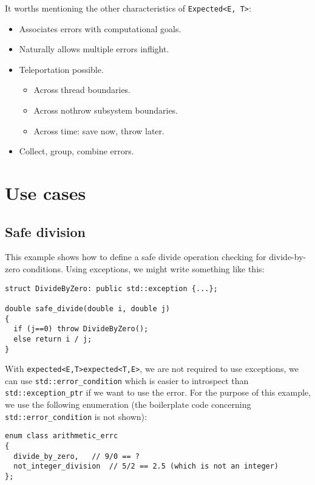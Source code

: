 \documentclass[a4paper,10pt]{article}
\newcommand{\cpp}[1]{\lstinline{#1}}
\newcommand{\suppress}[1]{\colorbox{suppress_color}{#1}}
\newcommand{\update}[1]{\colorbox{update_color}{#1}}
\begin{document}
\noindent
It worths mentioning the other characteristics of \cpp{Expected<E, T>}:

\begin{itemize}
 \item Associates errors with computational goals.
 \item Naturally allows multiple errors inflight.
 \item Teleportation possible.
 \begin{itemize}
  \item Across thread boundaries.
  \item Across nothrow subsystem boundaries.
  \item Across time: save now, throw later.
 \end{itemize}
 \item Collect, group, combine errors.
\end{itemize}

\section{Use cases}

\subsection{Safe division}
\label{divide-example}

This example shows how to define a safe divide operation checking for divide-by-zero conditions. Using exceptions, we might write something like this:

\begin{lstlisting}
struct DivideByZero: public std::exception {...};

double safe_divide(double i, double j)
{
  if (j==0) throw DivideByZero();
  else return i / j;
}
\end{lstlisting}

With \suppress{\cpp{expected<E,T>}}\update{\cpp{expected<T,E>}}, we are not required to use exceptions, we can use \cpp{std::error_condition} which is easier to introspect than \cpp{std::exception_ptr} if we want to use the error. For the purpose of this example, we use the following enumeration (the boilerplate code concerning \cpp{std::error_condition} is not shown):

\begin{lstlisting}
enum class arithmetic_errc
{
  divide_by_zero,   // 9/0 == ?
  not_integer_division  // 5/2 == 2.5 (which is not an integer)
};
\end{lstlisting}
\end{document}
